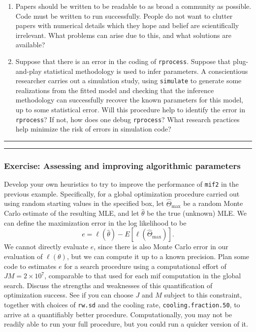 \documentclass[]{article}
\begin{document}
\begin{enumerate}
\def\labelenumi{\arabic{enumi}.}
\item
  Papers should be written to be readable to as broad a community as
  possible. Code must be written to run successfully. People do not want
  to clutter papers with numerical details which they hope and belief
  are scientifically irrelevant. What problems can arise due to this,
  and what solutions are available?
\item
  Suppose that there is an error in the coding of \texttt{rprocess}.
  Suppose that plug-and-play statistical methodology is used to infer
  parameters. A conscientious researcher carries out a simulation study,
  using \texttt{simulate} to generate some realizations from the fitted
  model and checking that the inference methodology can successfully
  recover the known parameters for this model, up to some statistical
  error. Will this procedure help to identify the error in
  \texttt{rprocess}? If not, how does one debug \texttt{rprocess}? What
  research practices help minimize the risk of errors in simulation
  code?
\end{enumerate}

\begin{center}\rule{0.5\linewidth}{\linethickness}\end{center}

\begin{center}\rule{0.5\linewidth}{\linethickness}\end{center}

\subsubsection{Exercise: Assessing and improving algorithmic
parameters}\label{exercise-assessing-and-improving-algorithmic-parameters}

Develop your own heuristics to try to improve the performance of
\texttt{mif2} in the previous example. Specifically, for a global
optimization procedure carried out using random starting values in the
specified box, let \(\hat\Theta_\mathrm{max}\) be a random Monte Carlo
estimate of the resulting MLE, and let \(\hat\theta\) be the true
(unknown) MLE. We can define the maximization error in the log
likelihood to be
\[e = \ell(\hat\theta) - E[\ell(\hat\Theta_\mathrm{max})].\] We cannot
directly evaluate \(e\), since there is also Monte Carlo error in our
evaluation of \(\ell(\theta)\), but we can compute it up to a known
precision. Plan some code to estimates \(e\) for a search procedure
using a computational effort of \(JM=2\times 10^7\), comparable to that
used for each mif computation in the global search. Discuss the
strengths and weaknesses of this quantification of optimization success.
See if you can choose \(J\) and \(M\) subject to this constraint,
together with choices of \texttt{rw.sd} and the cooling rate,
\texttt{cooling.fraction.50}, to arrive at a quantifiably better
procedure. Computationally, you may not be readily able to run your full
procedure, but you could run a quicker version of it.
\end{document}

